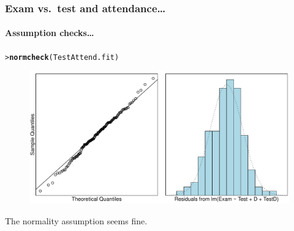 \documentclass{beamer}\usepackage[]{graphicx}\usepackage[]{xcolor}
\makeatletter
\newcommand{\hlstd}[1]{\textcolor[rgb]{0.345,0.345,0.345}{#1}}%
\newcommand{\hlkwd}[1]{\textcolor[rgb]{0.737,0.353,0.396}{\textbf{#1}}}%
\newenvironment{kframe}{%
 \def\at@end@of@kframe{}%
 \ifinner\ifhmode%
  \def\at@end@of@kframe{\end{minipage}}%
  \begin{minipage}{\columnwidth}%
 \fi\fi%
 \def\FrameCommand##1{\hskip\@totalleftmargin \hskip-\fboxsep
 \colorbox{shadecolor}{##1}\hskip-\fboxsep
     \hskip-\linewidth \hskip-\@totalleftmargin \hskip\columnwidth}%
 \MakeFramed {\advance\hsize-\width
   \@totalleftmargin\z@ \linewidth\hsize
   \@setminipage}}%
 {\par\unskip\endMakeFramed%
 \at@end@of@kframe}
\newenvironment{knitrout}{}{} %
\makeatother
\begin{document}
\begin{frame}[fragile]
\frametitle{Exam vs.\ test \textbf{and} attendance\ldots}
\framesubtitle{Assumption checks\ldots}

\begin{knitrout}\scriptsize
{}\color{fgcolor}\begin{kframe}
\begin{alltt}
\hlstd{> }\hlkwd{normcheck}\hlstd{(TestAttend.fit)}
\end{alltt}
\end{kframe}
\end{knitrout}



\begin{figure}
  \centering
  \includegraphics[scale=0.5]{figure/RC-H08-014}
\end{figure}

The normality assumption seems fine.
\end{frame}
\end{document}
